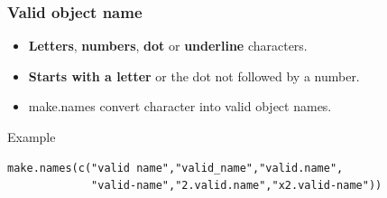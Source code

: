 \documentclass[10pt]{beamer}
\newenvironment{xframe}[2][]
  {\begin{frame}[fragile,environment=xframe,#1]
  \frametitle{#2}}
  {\end{frame}}
\begin{document}
\begin{xframe}{Valid object name}
  \begin{block}{}
    \begin{itemize}
    \item {\bf Letters}, {\bf numbers}, {\bf dot} or {\bf underline} characters.
    \item {\bf Starts with a letter} or the dot not followed by a number.
    \item {\sf make.names} convert character into valid object names.
    \end{itemize}
  \end{block}
  \begin{exampleblock}{Example}
\begin{verbatim}
make.names(c("valid name","valid_name","valid.name",
             "valid-name","2.valid.name","x2.valid-name"))
\end{verbatim}  
  \end{exampleblock}
\end{xframe}
\end{document}
